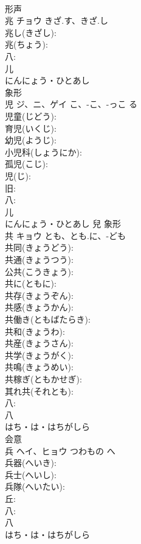\documentclass[8pt]{extreport}
\begin{document}
\begin{CJK}{UTF8}{min}
\\	形声 
\\	兆	チョウ	きざ.す、きざ.し		
\\	兆し(きざし): 
\\	兆(ちょう): 
\\	八: 
\\	儿	
\\	にんにょう・ひとあし	
\\	象形 
\\	児	ジ、ニ、ゲイ	こ、-こ、-っこ	る	
\\	児童(じどう): 
\\	育児(いくじ): 
\\	幼児(ようじ): 
\\	小児科(しょうにか): 
\\	孤児(こじ): 
\\	児(じ): 
\\	旧: 
\\	八: 
\\	儿	
\\	にんにょう・ひとあし	兒	象形 
\\	共	キョウ	とも、とも.に、-ども		
\\	共同(きょうどう): 
\\	共通(きょうつう): 
\\	公共(こうきょう): 
\\	共に(ともに): 
\\	共存(きょうぞん): 
\\	共感(きょうかん): 
\\	共働き(ともばたらき): 
\\	共和(きょうわ): 
\\	共産(きょうさん): 
\\	共学(きょうがく): 
\\	共鳴(きょうめい): 
\\	共稼ぎ(ともかせぎ): 
\\	其れ共(それとも): 
\\	八: 
\\	八	
\\	はち・は・はちがしら	
\\	会意 
\\	兵	ヘイ、ヒョウ	つわもの	へ	
\\	兵器(へいき): 
\\	兵士(へいし): 
\\	兵隊(へいたい): 
\\	丘: 
\\	八: 
\\	八	
\\	はち・は・はちがしら	

\end{CJK}
\end{document}
